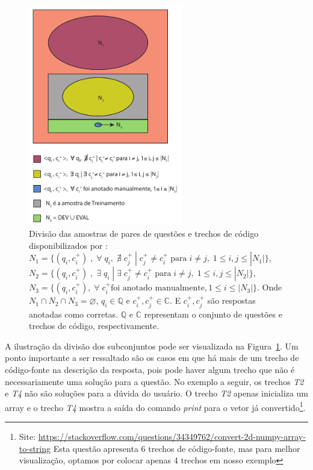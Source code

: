 \begin{figure}[H]
\centering
\includegraphics[width=0.6\textwidth]{figuras/cap-experimento/distinct-subsets-yao-sample.pdf}
\caption{Divisão das amostras de pares de questões e trechos de código disponibilizados por \cite{yao-2018}: $N_{1} = \{(q_{i}, c_{i}^{+})\;,\; \forall\; q_{i},\;\nexists\; c_{j}^{+}\; |\; c_{j}^{+} \neq c_{i}^{+}\; \text{para}\; i \neq j,\; 1 \leq i,j \leq |N_{1}| \}$, $N_{2} = \{(q_{i}, c_{i}^{+})\;,\; \exists\; q_{i}\; | \;\exists\; c_{j}^{+} \neq c_{i}^{+}\; \text{para} \; i \neq j,\; 1 \leq i,j \leq |N_{2}| \}$, $N_{3} = \{(q_{i}, c_{i}^{+}),\; \forall\; c_{i}^{+} \text{foi anotado manualmente}, 1 \leq i \leq |N_{3}| \}$. Onde $N_{1} \cap N_{2} \cap N_{3} = \varnothing$, $q_{i} \in \mathbb{Q}$ e $c_{i}^{+},  c_{j}^{+} \in \mathbb{C}$. E $c_{i}^{+}, c_{j}^{+}$ são respostas anotadas como corretas. $\mathbb{Q}$ e $\mathbb{C}$ representam o conjunto de questões e trechos de código, respectivamente.} 
\label{fig:distinct-subset-python-pair-question-code}
\end{figure}

A ilustração da divisão dos subconjuntos pode ser visualizada na Figura~\ref{fig:distinct-subset-python-pair-question-code}. Um ponto importante a ser ressaltado são os casos em que há mais de um trecho de código-fonte na descrição da resposta, pois pode haver algum trecho que não é necessariamente uma solução para a questão. No exemplo a seguir, os trechos \emph{T2} e \emph{T4} não são soluções para a dúvida do usuário. O trecho \emph{T2} apenas inicializa um array e o trecho \emph{T4} mostra a saída do comando \textit{print} para o vetor já convertido\footnote{Site: \url{https://stackoverflow.com/questions/34349762/convert-2d-numpy-array-to-string} Esta questão apresenta 6 trechos de código-fonte, mas para melhor visualização, optamos por colocar apenas 4 trechos em nosso exemplo\label{foot:exemplo-stackoverflow-mais-de-um-trecho}}.




